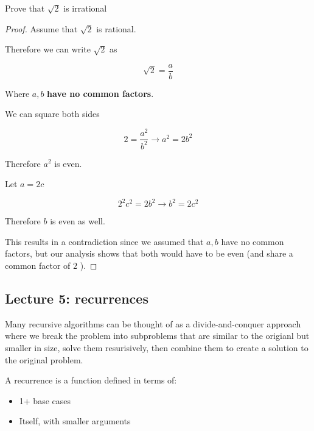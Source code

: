 \documentclass[../notes.tex]{subfiles}
\begin{document}
\begin{example}
	Prove that $ \sqrt{2}  $ is irrational
	\begin{proof}
		Assume that $ \sqrt{2}  $ is rational.

		Therefore we can write $ \sqrt{2}  $ as

		\begin{equation}
			\sqrt{2}  = \frac{a}{b}
		\end{equation}

		Where $ a, b $ \textbf{ have no common factors}.

		We can square both sides

		\begin{equation}
			2 = \frac{a^2}{b^2} \rightarrow a^2 = 2b^2
		\end{equation}

		Therefore $ a^2 $ is even. 

		Let $ a = 2c $ 

		\begin{equation}
			2^2 c^2 = 2b^2 \rightarrow b^2 = 2c^2
		\end{equation}

		Therefore $ b $ is even as well.

		This results in a contradiction since we assumed that $ a, b $ have no common factors, but our analysis shows that both would have to be even (and share a common factor of $ 2 $ ).
	\end{proof}
	
\end{example}


\subsection{Lecture 5: recurrences}
Many recursive algorithms can be thought of as a divide-and-conquer approach where we break the problem into subproblems that are similar to the origianl but smaller in size, solve them resurisively, then combine them to create a solution to the original problem.


\begin{definition}
	A recurrence is a function defined in terms of:
	\begin{itemize}
		\item 1+ base cases
		\item Itself, with smaller arguments
	\end{itemize}
\end{definition}
\end{document}
